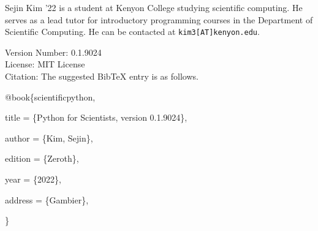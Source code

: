 \documentclass{book}
\newcommand{\booklicense}{MIT License}
\newcommand{\bookversion}{0.1.9024}
\begin{document}
\printindex

\noindent Sejin Kim '22 is a student at Kenyon College studying scientific computing. He serves as a lead tutor for introductory programming courses in the Department of Scientific Computing. He can be contacted at \verb|kim3[AT]kenyon.edu|.

\begin{titlepage}
\begin{flushleft}
Version Number: \bookversion\\
License: \booklicense\\
Citation: The suggested BibTeX entry is as follows.

\vspace{5mm}

{\selectfont
@book\{scientificpython,

    title = \{Python for Scientists, version \bookversion\},

    author = \{Kim, Sejin\},

    edition = \{Zeroth\},

    year = \{2022\},

    address = \{Gambier\},

\}
}
\end{flushleft}
\end{titlepage}
\restoregeometry
\end{document}
